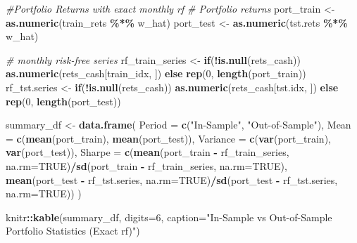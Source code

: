 \documentclass[
  12pt,
]{article}
\newenvironment{Shaded}{\begin{snugshade}}{\end{snugshade}}
\newcommand{\AttributeTok}[1]{\textcolor[rgb]{0.13,0.29,0.53}{#1}}
\newcommand{\CommentTok}[1]{\textcolor[rgb]{0.56,0.35,0.01}{\textit{#1}}}
\newcommand{\ConstantTok}[1]{\textcolor[rgb]{0.56,0.35,0.01}{#1}}
\newcommand{\ControlFlowTok}[1]{\textcolor[rgb]{0.13,0.29,0.53}{\textbf{#1}}}
\newcommand{\DecValTok}[1]{\textcolor[rgb]{0.00,0.00,0.81}{#1}}
\newcommand{\FunctionTok}[1]{\textcolor[rgb]{0.13,0.29,0.53}{\textbf{#1}}}
\newcommand{\NormalTok}[1]{#1}
\newcommand{\OtherTok}[1]{\textcolor[rgb]{0.56,0.35,0.01}{#1}}
\newcommand{\SpecialCharTok}[1]{\textcolor[rgb]{0.81,0.36,0.00}{\textbf{#1}}}
\newcommand{\StringTok}[1]{\textcolor[rgb]{0.31,0.60,0.02}{#1}}
\begin{document}
\begin{Shaded}
\begin{Highlighting}[]
\CommentTok{\#Portfolio Returns with exact monthly rf}
\CommentTok{\# Portfolio returns}
\NormalTok{port\_train }\OtherTok{\textless{}{-}} \FunctionTok{as.numeric}\NormalTok{(train\_rets }\SpecialCharTok{\%*\%}\NormalTok{ w\_hat)}
\NormalTok{port\_test  }\OtherTok{\textless{}{-}} \FunctionTok{as.numeric}\NormalTok{(tst.rets }\SpecialCharTok{\%*\%}\NormalTok{ w\_hat)}

\CommentTok{\# monthly risk{-}free series}
\NormalTok{rf\_train\_series }\OtherTok{\textless{}{-}} \ControlFlowTok{if}\NormalTok{(}\SpecialCharTok{!}\FunctionTok{is.null}\NormalTok{(rets\_cash)) }\FunctionTok{as.numeric}\NormalTok{(rets\_cash[train\_idx, ]) }\ControlFlowTok{else} \FunctionTok{rep}\NormalTok{(}\DecValTok{0}\NormalTok{, }\FunctionTok{length}\NormalTok{(port\_train))}
\NormalTok{rf\_tst.series  }\OtherTok{\textless{}{-}} \ControlFlowTok{if}\NormalTok{(}\SpecialCharTok{!}\FunctionTok{is.null}\NormalTok{(rets\_cash)) }\FunctionTok{as.numeric}\NormalTok{(rets\_cash[tst.idx, ]) }\ControlFlowTok{else} \FunctionTok{rep}\NormalTok{(}\DecValTok{0}\NormalTok{, }\FunctionTok{length}\NormalTok{(port\_test))}

\NormalTok{summary\_df }\OtherTok{\textless{}{-}} \FunctionTok{data.frame}\NormalTok{(}
  \AttributeTok{Period =} \FunctionTok{c}\NormalTok{(}\StringTok{"In{-}Sample"}\NormalTok{, }\StringTok{"Out{-}of{-}Sample"}\NormalTok{),}
  \AttributeTok{Mean =} \FunctionTok{c}\NormalTok{(}\FunctionTok{mean}\NormalTok{(port\_train), }\FunctionTok{mean}\NormalTok{(port\_test)),}
  \AttributeTok{Variance =} \FunctionTok{c}\NormalTok{(}\FunctionTok{var}\NormalTok{(port\_train), }\FunctionTok{var}\NormalTok{(port\_test)),}
  \AttributeTok{Sharpe =} \FunctionTok{c}\NormalTok{(}\FunctionTok{mean}\NormalTok{(port\_train }\SpecialCharTok{{-}}\NormalTok{ rf\_train\_series, }\AttributeTok{na.rm=}\ConstantTok{TRUE}\NormalTok{)}\SpecialCharTok{/}\FunctionTok{sd}\NormalTok{(port\_train }\SpecialCharTok{{-}}\NormalTok{ rf\_train\_series, }\AttributeTok{na.rm=}\ConstantTok{TRUE}\NormalTok{),}
             \FunctionTok{mean}\NormalTok{(port\_test  }\SpecialCharTok{{-}}\NormalTok{ rf\_tst.series,  }\AttributeTok{na.rm=}\ConstantTok{TRUE}\NormalTok{)}\SpecialCharTok{/}\FunctionTok{sd}\NormalTok{(port\_test  }\SpecialCharTok{{-}}\NormalTok{ rf\_tst.series,  }\AttributeTok{na.rm=}\ConstantTok{TRUE}\NormalTok{))}
\NormalTok{)}

\NormalTok{knitr}\SpecialCharTok{::}\FunctionTok{kable}\NormalTok{(summary\_df, }\AttributeTok{digits=}\DecValTok{6}\NormalTok{, }\AttributeTok{caption=}\StringTok{"In{-}Sample vs Out{-}of{-}Sample Portfolio Statistics (Exact rf)"}\NormalTok{)}
\end{Highlighting}
\end{Shaded}
\end{document}
